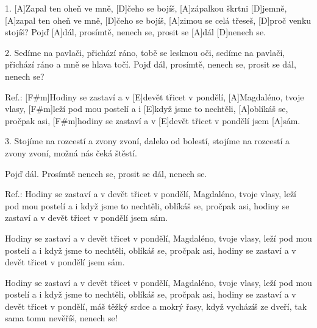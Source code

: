 
1.
[A]Zapal ten oheň ve mně, [D]\null čeho se bojíš,
[A]zápalkou škrtni [D]jemně,
[A]zapal ten oheň ve mně, [D]\null čeho se bojíš,
[A]zimou se celá třeseš, [D]proč venku stojíš?
Pojď [A]dál, prosímtě, nenech se, prosit se [A]dál
[D]nenech se. 

2.
Sedíme na pavlači, přichází ráno, 
tobě se lesknou oči,
sedíme na pavlači, přichází ráno 
a mně se hlava točí. 
Pojď dál, prosímtě, nenech se, prosit se dál,
nenech se? 

Ref.:
[F#m]Hodiny se zastaví a v [E]devět třicet v pondělí, 
[A]Magdaléno, tvoje vlasy, 
[F#m]leží pod mou postelí a i [E]když jsme to nechtěli, 
[A]oblíkáš se, pročpak asi,
[F#m]hodiny se zastaví a v [E]devět třicet v pondělí
jsem [A]sám. 

3.
Stojíme na rozcestí a zvony zvoní, 
daleko od bolestí, 
stojíme na rozcestí a zvony zvoní, 
možná nás čeká štěstí. 

Pojď dál. Prosímtě nenech se, prosit se dál,
nenech se.

Ref.:
Hodiny se zastaví a v devět třicet v pondělí,
Magdaléno, tvoje vlasy, 
leží pod mou postelí a i když jsme to nechtěli, 
oblíkáš se, pročpak asi,
hodiny se zastaví a v devět třicet v pondělí
jsem sám. 

Hodiny se zastaví a v devět třicet v pondělí, 
Magdaléno, tvoje vlasy, 
leží pod mou postelí a i když jsme to nechtěli, 
oblíkáš se, pročpak asi,
hodiny se zastaví a v devět třicet v pondělí
jsem sám. 

Hodiny se zastaví a v devět třicet v pondělí,
Magdaléno, tvoje vlasy, 
leží pod mou postelí a i když jsme to nechtěli,
oblíkáš se, pročpak asi,
hodiny se zastaví a v devět třicet v pondělí, 
máš těžký srdce a mokrý řasy,
když vycházíš ze dveří, tak sama tomu nevěříš, 
nenech se!

